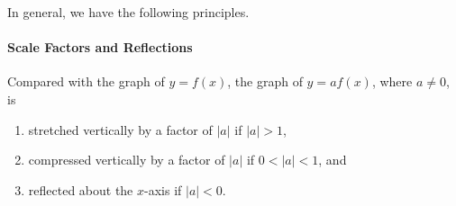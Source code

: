\documentclass[10pt,]{book}
\theoremstyle{plain}
\theoremstyle{definition}
\theoremstyle{definition}
\numberwithin{equation}{section}
\newcommand\abs[1]{\left|#1\right|}
\newcommand{\lt}{ < }
\newcommand{\gt}{ > }
\begin{document}
    In general, we have the following principles.
%
\typeout{************************************************}
\typeout{************************************************}
\paragraph[Scale Factors and Reflections]{Scale Factors and Reflections}\label{paragraphs-28}
%
\par

    Compared with the graph of \(y = f (x)\), the graph of \(y = a f (x)\), where \(a \ne 0\), is
    \leavevmode%
\begin{enumerate}
\item\hypertarget{li-308}{}stretched vertically by a factor of \(\abs{a}\) if \(\abs{a}\gt 1\),\item\hypertarget{li-309}{}compressed vertically by a factor of \(\abs{a}\) if \(0\lt\abs{a}\lt 1\), and\item\hypertarget{li-310}{}reflected about the \(x\)-axis if \(\abs{a}\lt 0\).\end{enumerate}
\end{document}

